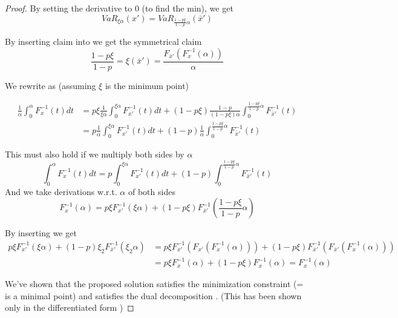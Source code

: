 \begin{proof}
By setting the derivative to 0 (to find the min), we get
\begin{equation}\label{eqn:varvar}
VaR_{\xi\alpha}(x')= VaR_{\frac{1-p\xi}{1-p}\alpha}(\bar{x}')
\end{equation}

By inserting claim  into  we get the symmetrical claim
\begin{equation}
\dfrac{1-p\xi}{1-p} = \xi(\bar{x}') = \dfrac{F_{\bar{x}'}(F^{-1}_x(\alpha))}{\alpha}
\end{equation}

We rewrite  as (assuming $\xi$ is the minimum point)

\begin{equation}
\begin{split}
\frac{1}{\alpha} \int_0^\alpha F^{-1}_{x}(t)dt &= p\xi \frac{1}{\xi\alpha} \int_0^{\xi\alpha} F^{-1}_{x'}(t)dt + (1-p\xi)\frac{1-p}{(1-p\xi)\alpha} \int_0^{\frac{1-p\xi}{1-p}\alpha} F^{-1}_{\bar{x}'}(t)\\
&=p \frac{1}{\alpha} \int_0^{\xi\alpha} F^{-1}_{x'}(t)dt + (1-p)\frac{1}{\alpha} \int_0^{\frac{1-p\xi}{1-p}\alpha} F^{-1}_{\bar{x}'}(t)
\end{split}
\end{equation}

This must also hold if we multiply both sides by $\alpha$
\begin{equation}
\int_0^\alpha F^{-1}_{x}(t)dt = p\int_0^{\xi\alpha} F^{-1}_{x'}(t)dt + (1-p)\int_0^{\frac{1-p\xi}{1-p}\alpha} F^{-1}_{\bar{x}'}(t)
\end{equation}
And we take derivations w.r.t. $\alpha$ of both sides
\begin{equation}
F^{-1}_{x}(\alpha) = p\xi F^{-1}_{x'}(\xi\alpha) + (1-p\xi) F^{-1}_{\bar{x}'}(\frac{1-p\xi}{1-p}\alpha)
\end{equation}


By inserting  we get
\begin{equation}
\begin{split}
 p\xi F_{x'}^{-1}(\xi\alpha) + (1-p)\xi_2 F_{\bar{x}'}^{-1}\left(\xi_2\alpha\right) &= p\xi F_{x'}^{-1}(F_{x'}(F^{-1}_x(\alpha))) + (1-p\xi) F_{\bar{x}'}^{-1}\left(F_{\bar{x}'}(F^{-1}_x(\alpha))\right)\\
 &= p\xi F_x^{-1}(\alpha) + (1-p\xi)F_x^{-1}(\alpha) = F_x^{-1}(\alpha)
\end{split}
\end{equation}

We've shown that the proposed solution  satisfies the minimization constraint  (= is a minimal point) and satisfies the dual decomposition . (This has been shown only in the differentiated form )

\end{proof}


